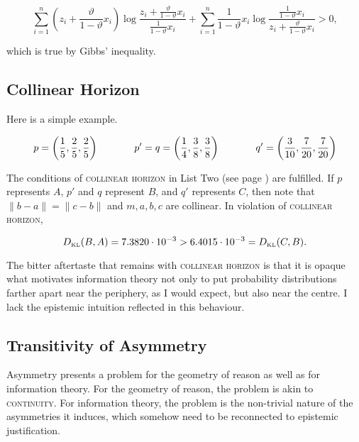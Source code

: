 \documentclass[11pt]{article}
\begin{document}
\begin{equation}
  \label{eq:ohrohshi}
  \sum_{i=1}^{n}\left(z_{i}+\frac{\vartheta}{1-\vartheta}x_{i}\right)\log\frac{z_{i}+\frac{\vartheta}{1-\vartheta}x_{i}}{\frac{1}{1-\vartheta}x_{i}}+
  \sum_{i=1}^{n}\frac{1}{1-\vartheta}x_{i}\log\frac{\frac{1}{1-\vartheta}x_{i}}{z_{i}+\frac{\vartheta}{1-\vartheta}x_{i}}>0,
\end{equation}

which is true by Gibbs' inequality.

\subsection{Collinear Horizon}
\label{subsec:colhor}

Here is a simple example.

\begin{equation}
  \label{eq:ubiesohx}
  p=\left(\frac{1}{5},\frac{2}{5},\frac{2}{5}\right) \hspace{.5in}
  p'=q=\left(\frac{1}{4},\frac{3}{8},\frac{3}{8}\right)  \hspace{.5in}
  q'=\left(\frac{3}{10},\frac{7}{20},\frac{7}{20}\right)
\end{equation}

The conditions of \textsc{collinear horizon} in List Two (see page
\pageref{page:listtwo}) are fulfilled. If $p$ represents $A$, $p'$ and
$q$ represent $B$, and $q'$ represents $C$, then note that
$\|b-a\|=\|c-b\|$ and $m,a,b,c$ are collinear. In violation of
\textsc{collinear horizon},

\begin{equation}
  \label{eq:eiloothu}
  D_{\mbox{\tiny KL}}(B,A)=7.3820\cdot{}10^{-3}>6.4015\cdot{}10^{-3}=D_{\mbox{\tiny KL}}(C,B).
\end{equation}

The bitter aftertaste that remains with \textsc{collinear horizon} is
that it is opaque what motivates information theory not only to put
probability distributions farther apart near the periphery, as I would
expect, but also near the centre. I lack the epistemic intuition
reflected in this behaviour.

\subsection{Transitivity of Asymmetry}
\label{subsec:Asymmetry}

Asymmetry presents a problem for the geometry of reason as well as for
information theory. For the geometry of reason, the problem is akin to
\textsc{continuity}. For information theory, the problem is the
non-trivial nature of the asymmetries it induces, which somehow need
to be reconnected to epistemic justification. 
\end{document}
